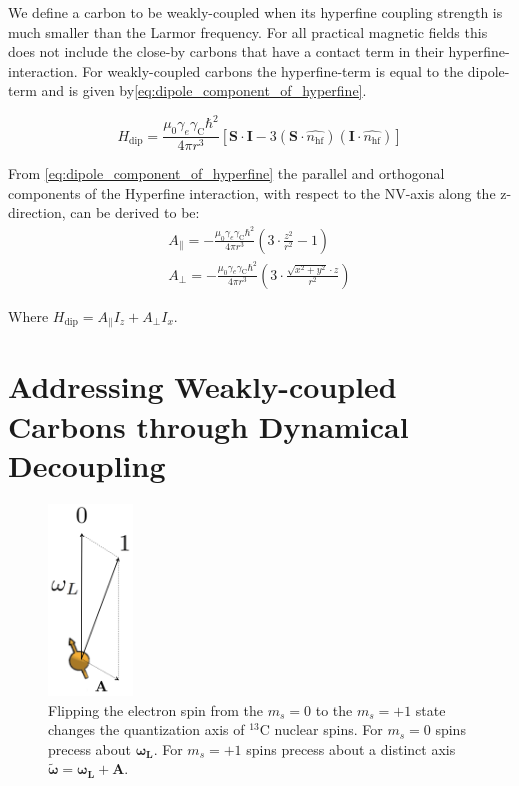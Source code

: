 We define a carbon to be weakly-coupled when its hyperfine coupling strength is much smaller than the Larmor frequency.
For all practical magnetic fields this does not include the close-by carbons that have a contact term in their hyperfine-interaction.
For weakly-coupled carbons the hyperfine-term is equal to the dipole-term and is given by\cref{eq:dipole_component_of_hyperfine}\citep{Lange2012Quantum}.

\begin{equation}
\label{eq:dipole_component_of_hyperfine}
H_{\mathrm{dip}} = \frac{\mu_0 \gamma_e \gamma_{\mathrm{C}} \hbar^2 }{4 \pi r^3} [ \bm{S \cdot I} - 3 (\bm S \cdot \hat{n_{\mathrm{hf}}})(\bm I \cdot \hat{n_{\mathrm{hf}}})]
\end{equation}

From \cref{eq:dipole_component_of_hyperfine}  the parallel and orthogonal components of the Hyperfine interaction, with respect to the NV-axis along the z-direction, can be derived to be:
 \begin{eqnarray}
A_\parallel= - \frac{\mu_0 \gamma_e \gamma_{\mathrm{C}} \hbar^2 }{4 \pi r^3} \left(3\cdot \frac{z^2}{r^2}-1\right)\\
 A_\perp =  -\frac{\mu_0 \gamma_e \gamma_{\mathrm{C}} \hbar^2 }{4 \pi r^3}\left( 3\cdot\frac{\sqrt{x^2+y^2}\cdot z}{r^2}\right)
\end{eqnarray}

Where $H_{\mathrm{dip}} = A_\parallel I_z + A_\perp I_x $.

\section{Addressing Weakly-coupled Carbons through Dynamical Decoupling}
\label{controllingacarbonthroughdynamicaldecoupling}

\begin{figure}[htbp]
\centering
\includegraphics[keepaspectratio,width=0.2\textwidth,height=0.75\textheight]{./img/QuantizationAxis.png}
\caption{Flipping the electron spin from the  $m_s=0$ to the $m_s= +1$ state changes the quantization axis of $^{13}\mathrm{C}$ nuclear spins. For  $m_s=0$ spins precess about $\bm{\omega_L}$. For  $m_s=+1$ spins precess about a distinct axis $\bm{\tilde{\omega}}=\bm{\omega_L} +\bm{A}$.}
\label{fig:quantax}
\end{figure}

